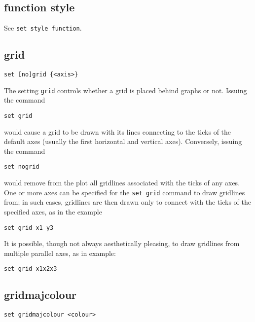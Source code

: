 \subsection{function style}

See {\tt set style function}.


\subsection{grid}

\begin{verbatim}
set [no]grid {<axis>}
\end{verbatim}

The setting {\tt grid} controls whether a grid is placed behind graphs or not.
Issuing the command

\begin{verbatim}
set grid
\end{verbatim}

\noindent would cause a grid to be drawn with its lines connecting to the ticks
of the default axes (usually the first horizontal and vertical axes).
Conversely, issuing the command

\begin{verbatim}
set nogrid
\end{verbatim}

\noindent would remove from the plot all gridlines associated with the ticks of
any axes.  One or more axes can be specified for the {\tt set grid} command to
draw gridlines from; in such cases, gridlines are then drawn only to connect
with the ticks of the specified axes, as in the example

\begin{verbatim}
set grid x1 y3
\end{verbatim}

It is possible, though not always aesthetically pleasing, to draw gridlines
from multiple parallel axes, as in example:

\begin{verbatim}
set grid x1x2x3
\end{verbatim}


\subsection{gridmajcolour}

\begin{verbatim}
set gridmajcolour <colour>
\end{verbatim}

